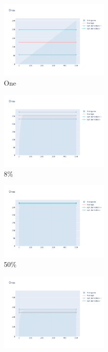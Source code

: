 \documentclass[12pt, fleqn]{report}                             %
\theoremstyle{break}                                            %
\begin{document}
      \begin{figure}[ht!]
        \centering
        \begin{subfigure}[b]{0.4\linewidth}
          \includegraphics[width=0.6\textwidth]{Images/78/dia-a.png}
          \caption{One}
        \end{subfigure}
        \begin{subfigure}[b]{0.4\linewidth}
          \includegraphics[width=0.6\textwidth]{Images/78/dia-b.png}
          \caption{8\%}
        \end{subfigure}
        \begin{subfigure}[b]{0.4\linewidth}
          \includegraphics[width=0.6\textwidth]{Images/78/dia-c.png}
          \caption{50\%}
        \end{subfigure}
        \begin{subfigure}[b]{0.4\linewidth}
          \includegraphics[width=0.6\textwidth]{Images/78/dia-d.png}

\end{subfigure}
\end{figure}
\end{document}
